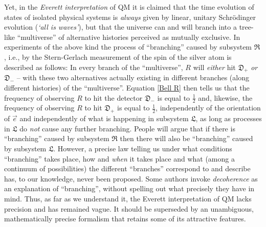 \documentclass[12pt]{article}
\begin{document}
Yet, in the \textit{Everett interpretation} of QM \cite{Everett} it is claimed that the time evolution of states of 
isolated physical systems is \textit{always} given by linear, unitary Schr\"odinger evolution (\textit{`all is waves'}), 
but that the universe can and will branch into a tree-like ``multiverse'' of alternative histories perceived as 
mutually exclusive. In experiments of the above kind the process of ``branching'' caused by subsystem $\mathfrak{R}$, 
i.e., by the Stern-Gerlach measurement of the spin of the silver atom is described as follows: In every branch 
of the ``multiverse'', $R$ will \textit{either} hit $\mathfrak{D}_{+}$ \textit{or} $\mathfrak{D}_{-}$ -- 
with these two alternatives actually existing in different branches (along different histories) of the 
``multiverse''.  Equation \eqref{Bell R} then tells us that the frequency of observing $R$ to hit the detector 
$\mathfrak{D}_{-}$ is equal to $\frac{1}{2}$ and, likewise, the frequency of observing 
$R$ to hit $\mathfrak{D}_{+}$ is equal to $\frac{1}{2}$, {{independently}} of the orientation of $\vec{e}$ and 
{{independently}} of what is happening in subsystem $\mathfrak{L}$, as long as processes in $\mathfrak{L}$ do 
\textit{not} cause any further branching. People will argue that if there is ``branching'' caused by subsystem 
$\mathfrak{R}$ then there will also be ``branching'' caused by subsystem $\mathfrak{L}$. However, a precise law 
telling us under what conditions ``branching'' takes place, how and \textit{when} it takes place and what (among 
a continuum of possibilities) the different ``branches'' correspond to and describe has, to our knowledge, never
been proposed. Some authors invoke \textit{decoherence} as an explanation of ``branching'', without spelling out 
what precisely they have in mind. Thus, as far as we understand it, the Everett interpretation of QM lacks precision 
and has remained vague. It should be superseded by an unambiguous, mathematically precise formalism that retains 
some of its attractive features. 
\end{document}
